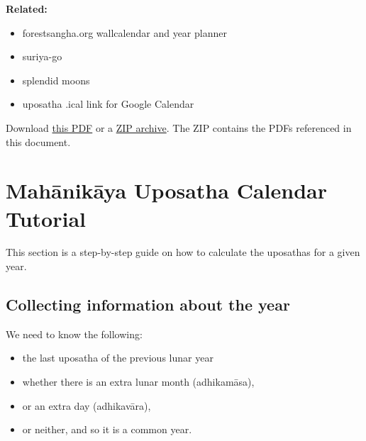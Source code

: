 \documentclass[11pt,oneside]{memoir-article}
\begin{document}
{\centering\large\bfseries
Related:
\par}

\begin{itemize}
\item forestsangha.org wallcalendar and year planner
\item suriya-go
\item splendid moons
\item uposatha .ical link for Google Calendar
\end{itemize}

Download \href{https://github.com/profound-labs/calculating-the-uposatha-moondays/raw/master/calculating-the-uposatha-moondays.pdf}{this PDF} or a \href{https://github.com/profound-labs/calculating-the-uposatha-moondays/archive/master.zip}{ZIP archive}. The ZIP contains the PDFs referenced in this document.

%

\clearpage

\chapter{Mahānikāya Uposatha Calendar Tutorial}
\label{sec-1}

This section is a step-by-step guide on how to calculate the uposathas for a
given year.

\section{Collecting information about the year}
\label{sec-1-1}

We need to know the following:

\begin{itemize}
\item the last uposatha of the previous lunar year
\item whether there is an extra lunar month (adhikamāsa),
\item or an extra day (adhikavāra),
\item or neither, and so it is a common year.
\end{itemize}
\end{document}
